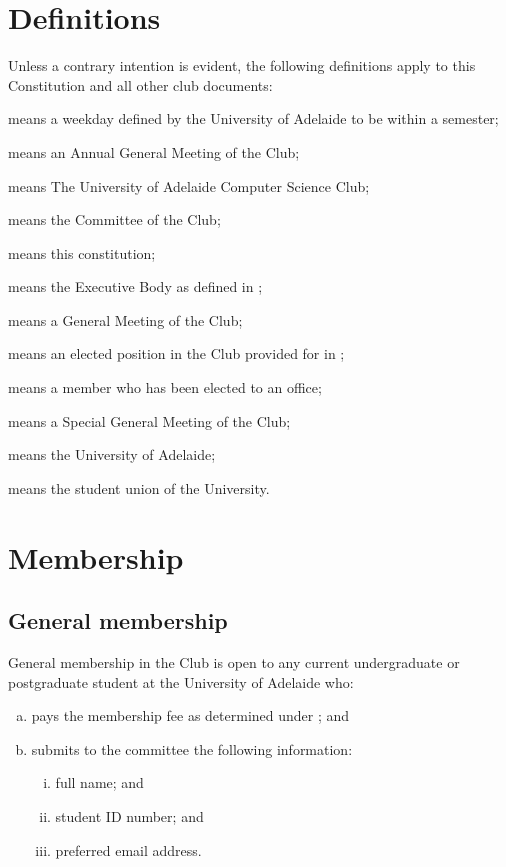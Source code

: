 \documentclass{constitution}
\begin{document}
\section{Definitions}\label{definitions}
Unless a contrary intention is evident, the following definitions apply to this Constitution and all other club documents:
\begin{description}
    \item {} means a weekday defined by the University of Adelaide to be within a semester;
    \item {} means an Annual General Meeting of the Club;
    \item {} means The University of Adelaide Computer Science Club;
    \item {} means the Committee of the Club;
    \item {} means this constitution;
    \item {} means the Executive Body as defined in ;
    \item {} means a General Meeting of the Club;
    \item {} means an elected position in the Club provided for in ;
    \item {} means a member who has been elected to an office;
    \item {} means a Special General Meeting of the Club;
    \item {} means the University of Adelaide;
    \item {} means the student union of the University.
\end{description}


\section{Membership}\label{membershipClub}

\subsection{General membership}\label{generalMembership}
General membership in the Club is open to any current undergraduate or postgraduate student at the University of Adelaide who:
\begin{enumerate}[(a)]
    \item pays the membership fee as determined under ; and
    \item submits to the committee the following information:
          \begin{enumerate}[(i)]
              \item full name; and
              \item student ID number; and
              \item preferred email address.
          \end{enumerate}
\end{enumerate}
\end{document}
